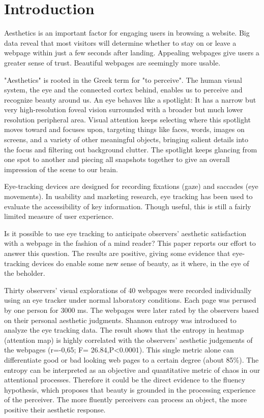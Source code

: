 
\section{Introduction}
\label{sec:intro}
Aesthetics is an important factor for engaging users in browsing a website. Big data reveal that most visitors will determine whether to stay on or leave a webpage within just a few seconds after landing\cite{Liu2010}.  Appealing webpages give users a greater sense of trust\cite{Everard2005}\cite{Lindgaard2011}. Beautiful webpages are seemingly more usable\cite{Tractinsky2000}.

"Aesthetics" is rooted in the Greek term for "to perceive". The human visual system, the eye and the connected cortex behind, enables us to perceive and recognize beauty around us. An eye behaves like a spotlight\cite{Eriksen1972}: It has a narrow but very high-resolution foveal vision surrounded with a broader but much lower resolution peripheral area. Visual attention keeps selecting where this spotlight moves toward and focuses upon, targeting things like faces, words, images on screens, and a variety of other meaningful objects, bringing salient details into the focus and filtering out background clutter. The spotlight keeps glancing from one spot to another and piecing all snapshots together to give an overall impression of the scene to our brain.

Eye-tracking devices are designed for recording fixations (gaze) and saccades (eye movements). In usability and marketing research, eye tracking has been used to evaluate the accessibility of key information. Though useful, this is still a fairly limited measure of user experience\cite{Santella}.

Is it possible to use eye tracking to anticipate observers' aesthetic satisfaction with a webpage in the fashion of a mind reader? This paper reports our effort to answer this question. The results are positive, giving some evidence that eye-tracking devices do enable some new sense of beauty, as it where, in the eye of the beholder.

Thirty observers' visual explorations of 40 webpages were recorded individually using an eye tracker under normal laboratory conditions. Each page was perused by one person for 3000 ms. The webpages were later rated by the observers based on their personal aesthetic judgments. Shannon entropy was introduced to analyze the eye tracking data. The result shows that the entropy in heatmap (attention map) is highly correlated with the observers' aesthetic judgements of the webpages (r=-0,65; F= 26.84,P<0.0001). This single metric alone can differentiate good or bad looking web pages to a certain degree (about 85\%). The entropy can be interpreted as an objective and quantitative metric of chaos in our attentional processes. Therefore it could be the direct evidence to the fluency hypothesis\cite{Reber2004}, which proposes that beauty is grounded in the processing experience of the perceiver. The more fluently perceivers can process an object, the more positive their aesthetic response.

